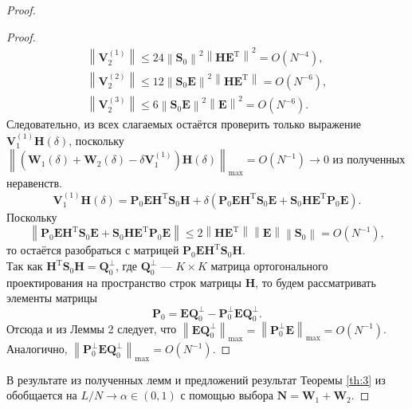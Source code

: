 \documentclass[specialist,
substylefile = spbu_report.rtx,
subf,href,colorlinks=true, 12pt]{disser}
\newcommand\norm[1]{\left\|#1\right\|}
\begin{document}
\begin{proof}
\begin{proof}
\begin{align*}
				\norm{\mathbf{V}_2^{(1)}}\leqslant 24\norm{\mathbf{S}_0}^2\norm{\mathbf{HE}^\mathrm{T}}^2=O(N^{-4}),\\
				\norm{\mathbf{V}_2^{(2)}}\leqslant 12\norm{\mathbf{S}_0\mathbf{E}}^2\norm{\mathbf{HE}^\mathrm{T}}=O(N^{-6}),\\
				\norm{\mathbf{V}_2^{(3)}}\leqslant 6\norm{\mathbf{S}_0\mathbf{E}}^2\norm{\mathbf{E}}^2=O(N^{-6}).
			\end{align*}
			Следовательно, из всех слагаемых остаётся проверить только выражение $\mathbf{V}_1^{(1)}\mathbf{H}(\delta)$, поскольку $\norm{(\mathbf{W}_1(\delta)+\mathbf{W}_2(\delta)-\delta\mathbf{V}_1^{(1)})\mathbf{H}(\delta)}_{\max}=O(N^{-1})\rightarrow 0$ из полученных неравенств. 
			\begin{equation*}
				\mathbf{V}_1^{(1)}\mathbf{H}(\delta) = \mathbf{P}_0\mathbf{EH}^\mathrm{T}\mathbf{S}_0\mathbf{H}+\delta(\mathbf{P}_0\mathbf{EH}^\mathrm{T}\mathbf{S}_0\mathbf{E}+\mathbf{S}_0\mathbf{HE}^\mathrm{T}\mathbf{P}_0\mathbf{E}).
			\end{equation*}
			Поскольку
			\begin{equation*}
				\norm{\mathbf{P}_0\mathbf{EH}^\mathrm{T}\mathbf{S}_0\mathbf{E}+\mathbf{S}_0\mathbf{HE}^\mathrm{T}\mathbf{P}_0\mathbf{E}}\leqslant 2\norm{\mathbf{HE}^\mathrm{T}}\norm{\mathbf{E}}\norm{\mathbf{S}_0}=O(N^{-1}),
			\end{equation*}
			то остаётся разобраться с матрицей $\mathbf{P}_0\mathbf{EH}^\mathrm{T}\mathbf{S}_0\mathbf{H}$.\\
			Так как $\mathbf{H}^\mathrm{T}\mathbf{S}_0\mathbf{H}=\mathbf{Q}_0^\bot$, где $\mathbf{Q}_0^\bot$ --- $K\times K$ матрица ортогонального проектирования на пространство строк матрицы $\mathbf{H}$, то будем рассматривать элементы матрицы
			\begin{equation*}
				\mathbf{P}_0 = \mathbf{E}\mathbf{Q}_0^\bot - \mathbf{P}_0^\bot\mathbf{E}\mathbf{Q}_0^\bot.
			\end{equation*}
			Отсюда и из Леммы 2 \cite{ZNekrutkin} следует, что $\norm{\mathbf{E}\mathbf{Q}_0^\bot}_{\max}=\norm{\mathbf{P}_0^\bot\mathbf{E}}_{\max}=O(N^{-1})$. Аналогично, $\norm{\mathbf{P}_0^\bot\mathbf{E}\mathbf{Q}_0^\bot}_{\max}=O(N^{-1})$.
		\end{proof}
		В результате из полученных лемм и предложений результат Теоремы \ref{th:3} из \cite{ZNekrutkin} обобщается на $L/N\rightarrow \alpha\in(0, 1)$ с помощью выбора $\mathbf{N} = \mathbf{W}_1 + \mathbf{W}_2$.
	\end{proof} 
\end{document}
